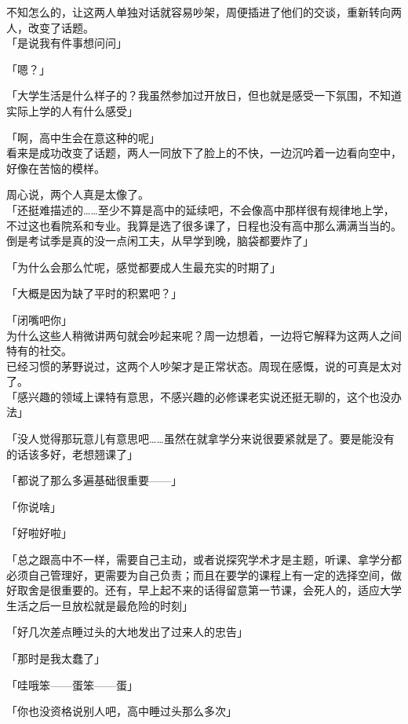 不知怎么的，让这两人单独对话就容易吵架，周便插进了他们的交谈，重新转向两人，改变了话题。\\

「是说我有件事想问问」

「嗯？」

「大学生活是什么样子的？我虽然参加过开放日，但也就是感受一下氛围，不知道实际上学的人有什么感受」

「啊，高中生会在意这种的呢」\\

看来是成功改变了话题，两人一同放下了脸上的不快，一边沉吟着一边看向空中，好像在苦恼的模样。

周心说，两个人真是太像了。\\

「还挺难描述的……至少不算是高中的延续吧，不会像高中那样很有规律地上学，不过这也看院系和专业。我算是选了很多课了，日程也没有高中那么满满当当的。倒是考试季是真的没一点闲工夫，从早学到晚，脑袋都要炸了」

「为什么会那么忙呢，感觉都要成人生最充实的时期了」

「大概是因为缺了平时的积累吧？」

「闭嘴吧你」\\

为什么这些人稍微讲两句就会吵起来呢？周一边想着，一边将它解释为这两人之间特有的社交。\\

已经习惯的茅野说过，这两个人吵架才是正常状态。周现在感慨，说的可真是太对了。\\

「感兴趣的领域上课特有意思，不感兴趣的必修课老实说还挺无聊的，这个也没办法」

「没人觉得那玩意儿有意思吧……虽然在就拿学分来说很要紧就是了。要是能没有的话该多好，老想翘课了」

「都说了那么多遍基础很重要——」

「你说啥」

「好啦好啦」

「总之跟高中不一样，需要自己主动，或者说探究学术才是主题，听课、拿学分都必须自己管理好，更需要为自己负责；而且在要学的课程上有一定的选择空间，做好取舍是很重要的。还有，早上起不来的话得留意第一节课，会死人的，适应大学生活之后一旦放松就是最危险的时刻」

「好几次差点睡过头的大地发出了过来人的忠告」

「那时是我太蠢了」

「哇哦笨——蛋笨——蛋」

「你也没资格说别人吧，高中睡过头那么多次」\\


